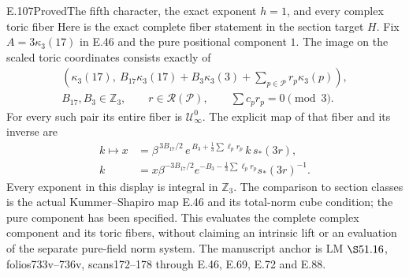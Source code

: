 \begin{statement}{E.107}{Proved}{The fifth character, the exact exponent \(h=1\), and every complex toric fiber}
Here is the exact complete fiber statement in the section target \(H\).
Fix \(A=3\kappa_3(17)\) in E.46 and the pure positional component \(1\).
The image on the scaled toric coordinates consists exactly of
\[
 \begin{gathered}
 \left(\kappa_3(17),\
 B_{17}\kappa_3(17)+B_3\kappa_3(3)+
                  \sum_{p\in\mathcal P}r_p\kappa_3(p)\right),\\
 B_{17},B_3\in\mathbb Z_3,\qquad
 r\in\mathscr R(\mathcal P),\qquad
 \sum c_pr_p=0\pmod3.
 \end{gathered}
 \tag{E107.13}
\]
For every such pair its entire fiber is \(\mathcal U_\infty^0\).
The explicit map of that fiber and its inverse are
\[
 \begin{aligned}
 k\longmapsto x
   &=\beta^{\,3B_{17}/2}\,
     e^{\,B_3+\frac13\sum\ell_pr_p}\,
     k\,s_*(3r),\\
 k&=x\beta^{-3B_{17}/2}
     e^{-B_3-\frac13\sum\ell_pr_p}s_*(3r)^{-1}.
 \end{aligned}
 \tag{E107.14}
\]
Every exponent in this display is integral in \(\mathbb Z_3\).
The comparison to section classes is the actual Kummer--Shapiro
map E.46 and its total-norm cube condition; the pure component
has been specified. This evaluates the complete complex component
and its toric fibers, without claiming an intrinsic lift or an
evaluation of the separate pure-field norm system.
The manuscript anchor is LM \(\S51.16\), folios733v--736v,
scans172--178 through E.46, E.69, E.72 and E.88.
\end{statement}

